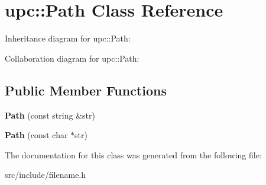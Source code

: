 \hypertarget{classupc_1_1Path}{}\section{upc\+:\+:Path Class Reference}
\label{classupc_1_1Path}


Inheritance diagram for upc\+:\+:Path\+:


Collaboration diagram for upc\+:\+:Path\+:
\subsection*{Public Member Functions}
\begin{DoxyCompactItemize}
\item 
\mbox{\label{classupc_1_1Path_a364200f9a453fedd5ba68f79f8b93154}} 
{\bfseries Path} (const string \&str)
\item 
\mbox{\label{classupc_1_1Path_a082270e960275af46d65c3ce252ef581}} 
{\bfseries Path} (const char $\ast$str)
\end{DoxyCompactItemize}


The documentation for this class was generated from the following file\+:\begin{DoxyCompactItemize}
\item 
src/include/filename.\+h\end{DoxyCompactItemize}

